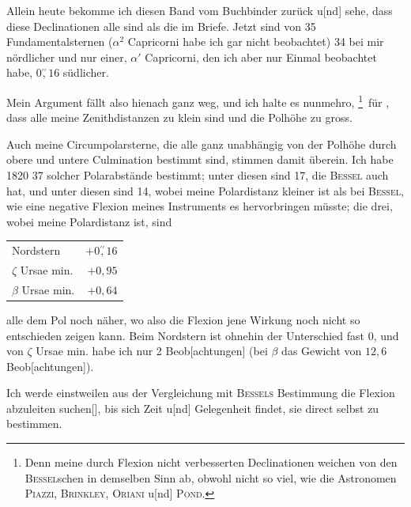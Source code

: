 Allein heute bekomme ich diesen Band vom Buchbinder zurück u[nd] sehe, dass diese Declinationen alle  sind als die im Briefe. Jetzt sind von 35 Fundamentalsternen (\(\alpha^2\) Capricorni habe ich gar nicht beobachtet) 34 bei mir nördlicher und nur einer, \(\alpha'\) Capricorni, den ich aber nur Einmal beobachtet habe, \(0\overset{\prime\prime}{,}16\) südlicher.

Mein Argument fällt also hienach ganz weg, und ich halte es nunmehro, \begingroup\renewcommand{\thefootnote}{**)}\footnote{Denn meine durch Flexion nicht verbesserten Declinationen weichen von den \textsc{Bessel}schen in demselben Sinn ab, obwohl nicht so viel, wie die  Astronomen \textsc{Piazzi}, \textsc{Brinkley}, \textsc{Oriani} u[nd] \textsc{Pond}.}\endgroup\ für 
\clearpage{}
\noindent{}, dass alle meine Zenithdistanzen zu klein sind und die Polhöhe zu gross.

Auch meine Circumpolarsterne, die alle ganz unabhängig von der Polhöhe durch obere und untere Culmination bestimmt sind, stimmen damit überein. Ich habe 1820 37 solcher Polarabstände bestimmt; unter diesen sind 17, die \textsc{Bessel} auch hat, und unter diesen sind 14, wobei meine Polardistanz kleiner ist als bei \textsc{Bessel}, wie eine negative Flexion meines Instruments es hervorbringen müsste; die drei, wobei meine Polardistanz  ist, sind
\begin{center}\begin{tabular}{@{}lr@{}}
Nordstern & \(+0\overset{\prime\prime}{,}16\)\\
\(\zeta\) Ursae min. & \(+0{,}95\)\\
\(\beta\) Ursae min. & \(+0{,}64\)
\end{tabular}\end{center}
\noindent alle dem Pol noch näher, wo also die Flexion jene Wirkung noch nicht so entschieden zeigen kann. Beim Nordstern ist ohnehin der Unterschied fast 0, und von \(\zeta\) Ursae min. habe ich nur 2 Beob[achtungen] (bei \(\beta\) das Gewicht von \(12{,}6\) Beob[achtungen]).

Ich werde einstweilen aus der Vergleichung mit \textsc{Bessels} Bestimmung die Flexion abzuleiten suchen[\begingroup\renewcommand{\thefootnote}{*)}\footnotemark\renewcommand{\thefootnote}{[*)}\footnotetext{Vgl. Notiz 5 und den Brief an \textsc{Bessel} vom 14. März 1824, S. 338.]}\endgroup], bis sich Zeit u[nd] Gelegenheit findet, sie direct selbst zu bestimmen.

